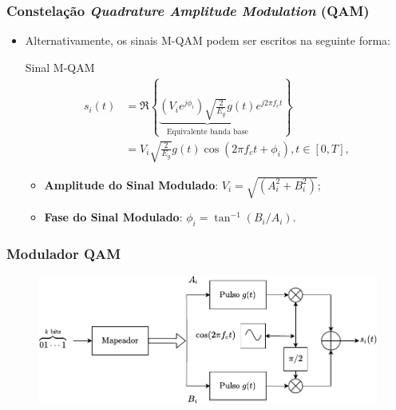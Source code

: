 \documentclass{beamer}
\newcommand{\pag}[1] {\begin{frame}#1\end{frame}}
\begin{document}
\pag{
	\frametitle{Constelação \textit{Quadrature Amplitude Modulation} (QAM)}
	\begin{itemize}
		\item Alternativamente, os sinais M-QAM podem ser escritos na seguinte forma:
		\begin{block}{Sinal M-QAM}
			\begin{equation}
				\begin{aligned}
				s_{i}(t) &= \Re\left\{\underbrace{(V_{i}e^{j\phi_{i}})\sqrt{\frac{2}{E_{g}}}g(t)}_{\text{Equivalente banda base}}e^{j2\pi f_{c}t}\right\} \\
				&= V_{i}\sqrt{\frac{2}{E_{g}}}g(t)\cos( 2\pi f_{c} t + \phi_{i} ), t \in [0,T],
				\end{aligned}
			\end{equation}
			\vspace{-0.5cm}
				\begin{itemize}
					\item \textbf{Amplitude do Sinal Modulado}: $V_{i} = \sqrt{(A_{i}^2 + B_{i}^2)}$;
					\item \textbf{Fase do Sinal Modulado}: $\phi_{i} = \tan^{-1}(B_{i} / A_{i})$.
				\end{itemize}
		\end{block}
	\end{itemize}	
}

\pag{
	\frametitle{Modulador QAM}
			\begin{figure}[!h]
				\centering
			  \includegraphics[width = 0.95\linewidth]{QAMMod.pdf}
				\label{QAMMod}
			\end{figure}
}
\end{document}
